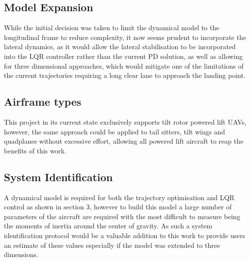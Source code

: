 \subsection{Model Expansion}
While the initial decision was taken to limit the dynamical model to the longitudinal frame to reduce complexity, it now seems prudent to incorporate the lateral dynamics, as it would allow the lateral stabilisation to be incorporated into the LQR controller rather than the current PD solution, as well as allowing for three dimensional approaches, which would mitigate one of the limitations of the current trajectories requiring a long clear lane to approach the landing point.

\subsection{Airframe types}
This project in its current state exclusively supports tilt rotor powered lift UAVs, however, the same approach could be applied to tail sitters, tilt wings and quadplanes without excessive effort, allowing all powered lift aircraft to reap the benefits of this work.

\subsection{System Identification}
A dynamical model is required for both the trajectory optimisation and LQR control as shown in section 3, however to build this model a large number of parameters of the aircraft are required with the most difficult to measure being the moments of inertia around the center of gravity. As such a system identification protocol would be a valuable addition to this work to provide users an estimate of these values especially if the model was extended to three dimensions.